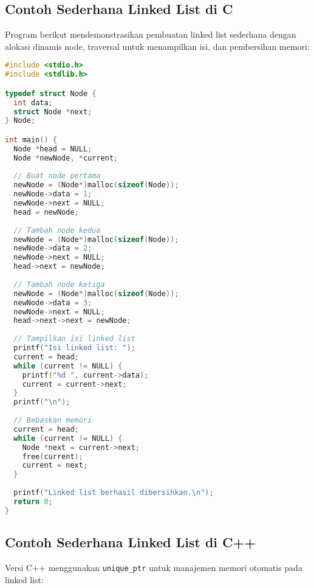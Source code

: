 \documentclass[../main.tex]{subfiles}
\begin{document}
\subsection{Contoh Sederhana Linked List di C}

Program berikut mendemonstrasikan pembuatan linked list sederhana dengan alokasi dinamis node, traversal untuk menampilkan isi, dan pembersihan memori:

\begin{lstlisting}[language=C, caption={Linked list sederhana di C}]
#include <stdio.h>
#include <stdlib.h>

typedef struct Node {
  int data;
  struct Node *next;
} Node;

int main() {
  Node *head = NULL;
  Node *newNode, *current;
  
  // Buat node pertama
  newNode = (Node*)malloc(sizeof(Node));
  newNode->data = 1;
  newNode->next = NULL;
  head = newNode;
  
  // Tambah node kedua
  newNode = (Node*)malloc(sizeof(Node));
  newNode->data = 2;
  newNode->next = NULL;
  head->next = newNode;
  
  // Tambah node ketiga
  newNode = (Node*)malloc(sizeof(Node));
  newNode->data = 3;
  newNode->next = NULL;
  head->next->next = newNode;
  
  // Tampilkan isi linked list
  printf("Isi linked list: ");
  current = head;
  while (current != NULL) {
    printf("%d ", current->data);
    current = current->next;
  }
  printf("\n");
  
  // Bebaskan memori
  current = head;
  while (current != NULL) {
    Node *next = current->next;
    free(current);
    current = next;
  }
  
  printf("Linked list berhasil dibersihkan.\n");
  return 0;
}
\end{lstlisting}

\subsection{Contoh Sederhana Linked List di C++}

Versi C++ menggunakan \texttt{unique\_ptr} untuk manajemen memori otomatis pada linked list:
\end{document}
